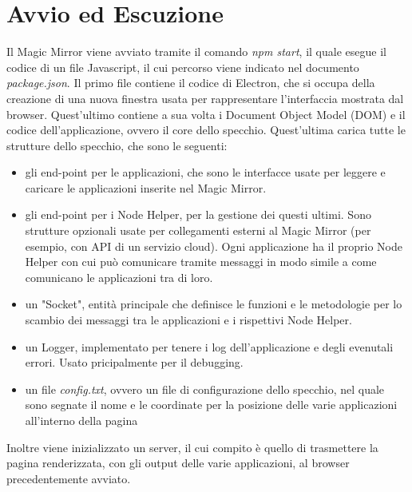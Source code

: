 \section{Avvio ed Escuzione}
Il Magic Mirror viene avviato tramite il comando \textit{npm start}, il quale esegue
il codice di un file Javascript, il cui percorso viene indicato nel documento \textit{package.json}.
Il primo file contiene il codice di Electron, che si occupa della creazione di una nuova finestra usata per rappresentare l'interfaccia mostrata dal browser.
Quest'ultimo contiene a sua volta i Document Object Model (DOM) e il codice dell'applicazione, ovvero il core dello specchio.
Quest'ultima carica tutte le strutture dello specchio, che sono le seguenti:
\begin{itemize}
\item gli end-point per le applicazioni, che sono le interfacce usate per leggere e caricare le applicazioni inserite nel Magic Mirror.
\item gli end-point per i Node Helper, per la gestione dei questi ultimi. Sono strutture opzionali usate per collegamenti
esterni al Magic Mirror (per esempio, con API di un servizio cloud). Ogni applicazione ha il proprio Node Helper con cui pu\`o comunicare tramite messaggi in modo
simile a come comunicano le applicazioni tra di loro.
\item un "Socket", entit\`a principale che definisce le funzioni e le metodologie per lo scambio dei messaggi tra le applicazioni e i rispettivi Node Helper.
\item un Logger, implementato per tenere i log dell'applicazione e degli evenutali errori. Usato pricipalmente per il debugging.
\item un file \textit{config.txt}, ovvero un file di configurazione dello specchio, nel quale sono segnate il nome e le coordinate per la posizione delle varie applicazioni
all'interno della pagina\\[2\baselineskip]
\end{itemize}
Inoltre viene inizializzato un server, il cui compito \`e quello di trasmettere la pagina renderizzata, con gli output delle varie applicazioni,
al browser precedentemente avviato.


